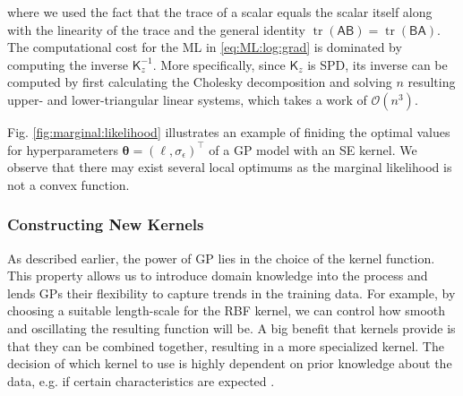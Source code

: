 \documentclass[10pt]{article}
\theoremstyle{definition}
\DeclareMathOperator{\tr}{tr}
\begin{document}
where we used the fact that the trace of a scalar equals the scalar itself along with the linearity of the trace and the general identity $\tr(\mathsf{A}\mathsf{B})=\tr(\mathsf{B}\mathsf{A})$. The computational cost for the ML in \eqref{eq:ML:log:grad} is dominated by computing the inverse $\mathsf{K}_z^{-1}$. More specifically, since $\mathsf{K}_z$ is SPD, its inverse can be computed by first calculating the Cholesky decomposition and solving $n$ resulting upper- and lower-triangular linear systems, which takes a work of $\mathcal{O}(n^3)$.

Fig. \ref{fig:marginal:likelihood} illustrates an example of finiding the optimal values for hyperparameters $\boldsymbol{\theta}=(\ell, \sigma_{\epsilon})^{\top}$ of a GP model with an SE kernel. We observe that there may exist several local optimums as the marginal likelihood is not a convex function.

\subsubsection{Constructing New Kernels}
As described earlier, the power of GP lies in the choice of the kernel function. This property allows us to introduce domain knowledge into the process and lends GPs their flexibility to capture trends in the training data. For example, by choosing a suitable length-scale for the RBF kernel, we can control how smooth and oscillating the resulting function will be. A big benefit that kernels provide is that they can be combined together, resulting in a more specialized kernel. The decision of which kernel to use is highly dependent on prior knowledge about the data, e.g. if certain characteristics are expected \cite{Gortler2019}.
\end{document}
